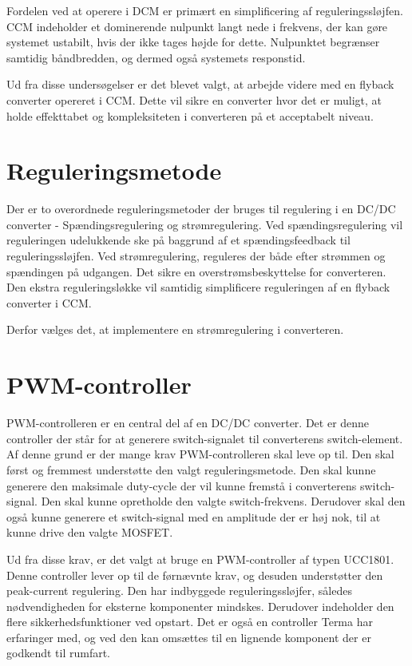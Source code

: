 Fordelen ved at operere i DCM er primært en simplificering af reguleringssløjfen. CCM indeholder et dominerende nulpunkt langt nede i frekvens, der kan gøre systemet ustabilt, hvis der ikke tages højde for dette. Nulpunktet begrænser samtidig båndbredden, og dermed også systemets responstid. 

Ud fra disse undersøgelser er det blevet valgt, at arbejde videre med en flyback converter opereret i CCM. Dette vil sikre en converter hvor det er muligt, at holde effekttabet og kompleksiteten i converteren på et acceptabelt niveau. 

\section{Reguleringsmetode}
Der er to overordnede reguleringsmetoder der bruges til regulering i en DC/DC converter - Spændingsregulering og strømregulering. Ved spændingsregulering vil reguleringen udelukkende ske på baggrund af et spændingsfeedback til reguleringssløjfen. Ved strømregulering, reguleres der både efter strømmen og spændingen på udgangen. Det sikre en overstrømsbeskyttelse for converteren. Den ekstra reguleringsløkke vil samtidig simplificere reguleringen af en flyback converter i CCM. 

\noindent Derfor vælges det, at implementere en strømregulering i converteren. 

\section{PWM-controller}
PWM-controlleren er en central del af en DC/DC converter. Det er denne controller der står for at generere switch-signalet til converterens switch-element. Af denne grund er der mange krav PWM-controlleren skal leve op til. Den skal først og fremmest understøtte den valgt reguleringsmetode. Den skal kunne generere den maksimale duty-cycle der vil kunne fremstå i converterens switch-signal. Den skal kunne opretholde den valgte switch-frekvens. Derudover skal den også kunne generere et switch-signal med en amplitude der er høj nok, til at kunne drive den valgte MOSFET.

Ud fra disse krav, er det valgt at bruge en PWM-controller af typen UCC1801\cite{UCC1801}. Denne controller lever op til de førnævnte krav, og desuden understøtter den peak-current regulering. Den har indbyggede reguleringssløjfer, således nødvendigheden for eksterne komponenter mindskes. Derudover indeholder den flere sikkerhedsfunktioner ved opstart. Det er også en controller Terma har erfaringer med, og ved den kan omsættes til en lignende komponent der er godkendt til rumfart. 

